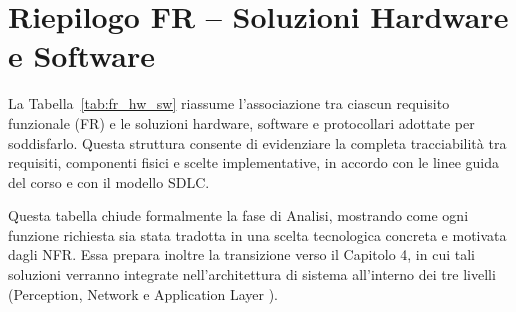    
   \section{Riepilogo FR -- Soluzioni Hardware e Software} 
   
La Tabella~\ref{tab:fr_hw_sw} riassume l’associazione tra ciascun requisito funzionale (FR) e le soluzioni hardware, software e protocollari adottate per soddisfarlo. Questa struttura consente di evidenziare la completa tracciabilità tra requisiti, componenti fisici e scelte implementative, in accordo con le linee guida del corso e con il modello SDLC. 
   
Questa tabella chiude formalmente la fase di Analisi, mostrando come ogni funzione richiesta
sia stata tradotta in una scelta tecnologica concreta e motivata dagli NFR. Essa prepara inoltre
la transizione verso il Capitolo 4, in cui tali soluzioni verranno integrate nell’architettura di
sistema all’interno dei tre livelli (Perception, Network e Application Layer ).


